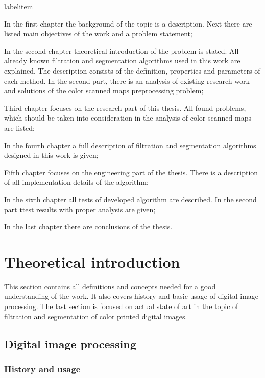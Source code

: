 \documentclass[a4paper,onecolumn,oneside,12pt]{memoir}
\makeatletter
\renewenvironment{itemize}{
  \begin{list}{  
  \csname labelitem\romannumeral\the\@listdepth\endcsname}{
  \setlength{\leftmargin}{1em}
	\setlength{\topsep}{6pt}%
	\setlength{\partopsep}{0pt}%
	\setlength{\parskip}{0pt}%
	\setlength{\parsep}{0pt}%
	\setlength{\itemsep}{0pt}}
}{
  \end{list}
}
\makeatother
\begin{document}
\begin{itemize}
  \item In the first chapter the background of the topic is a description.
        Next there are listed main objectives of the work and a problem statement;
  \item In the second chapter theoretical introduction of the problem is stated. All already known
        filtration and segmentation algorithms used in this work are explained.
        The description consists of the definition, properties and parameters of each method. In the
        second part, there is an analysis of existing research work and solutions of the color
        scanned maps preprocessing problem;
  \item Third chapter focuses on the research part of this thesis. All found problems,
        which should be taken into consideration in the analysis of color scanned maps are listed;
  \item In the fourth chapter a full description of filtration and segmentation algorithms
        designed in this work is given;
  \item Fifth chapter focuses on the engineering part of the thesis. There is a description of all
        implementation details of the algorithm;
  \item In the sixth chapter all tests of developed algorithm are described. In the second part
        ttest results with proper analysis are given;
  \item In the last chapter there are conclusions of the thesis.
\end{itemize}

\chapter{Theoretical introduction}

This section contains all definitions and concepts needed for a good understanding of the work. It
also covers history and basic usage of digital image processing. The last section is focused on
actual state of art in the topic of filtration and segmentation of color printed digital images.

\section{Digital image processing}

\subsection{History and usage}
\end{document}

